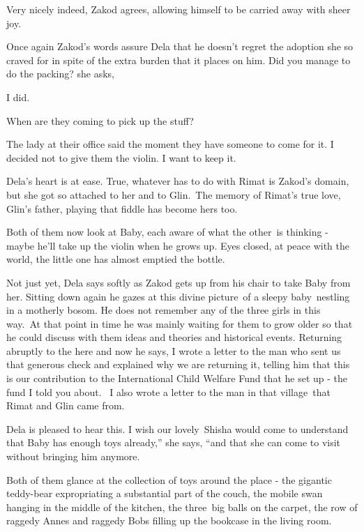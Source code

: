 \documentclass[letterpaper]{article}
\begin{document}
{\textquotedbl}Very nicely indeed,{\textquotedbl} Zakod agrees, allowing himself to be carried away with sheer joy.

Once again Zakod's words assure Dela that he doesn't regret the adoption she so craved for in spite of the extra burden
that it places on him. {\textquotedbl}Did you manage to do the packing?{\textquotedbl} she asks,

{\textquotedbl}I did.{\textquotedbl} 

{\textquotedbl}When are they coming to pick up the stuff?{\textquotedbl} 

{\textquotedbl}The lady at their office said the moment they have someone to come for it. I decided not to give them the
violin. I want to keep it.{\textquotedbl}

Dela{}'s heart is at ease. True, whatever has to do with Rimat is Zakod's domain, but she got so attached to her and to
Glin.\ The memory of Rimat's true love, Glin's father, playing that fiddle has become hers too. 

Both of them now look at Baby, each aware of what the other~is thinking - maybe he'll take up the violin when he grows
up. Eyes closed, at peace with the world, the little one has almost emptied the bottle.\ 

{\textquotedbl}Not just yet,{\textquotedbl} Dela says softly as Zakod gets up from his chair to take Baby from her.
Sitting down again he gazes at this divine picture~of a sleepy baby~nestling in a motherly bosom. He does not remember
any of the three girls in this way.\ At that point in time he was mainly waiting for them to grow older so that he
could discuss with them ideas and theories and historical events. Returning abruptly to the here and now he says,
{\textquotedbl}I wrote a letter to the man who sent us that generous check and explained why we are returning it,
telling him that this is our contribution to the International Child Welfare Fund that he set up - the fund I told you
about. ~I also wrote a letter to the man in that village\ that Rimat and Glin came from.{\textquotedbl} 

Dela is pleased to hear this. {\textquotedbl}I wish our lovely~Shisha would come to understand that Baby has enough toys
already,'' she says, ``and that she can come to visit without bringing him anymore.{\textquotedbl}

Both of them glance at the collection of toys around the place - the gigantic teddy-bear expropriating a substantial
part of the couch, the mobile swan hanging in the middle of the kitchen, the three~big balls on the carpet, the row of
raggedy Annes and raggedy Bobs filling up the bookcase in the living room. 
\end{document}
